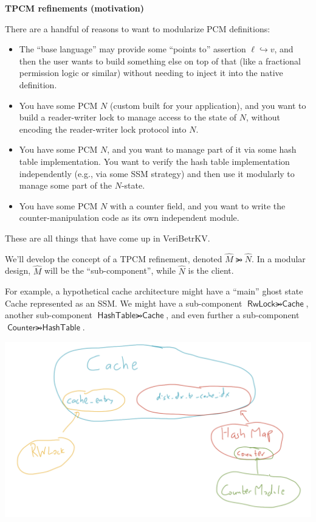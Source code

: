 \documentclass{article}
\newcommand{\pointsto}{\hookrightarrow}
\newcommand{\refines}{\rightarrowgtr}
\begin{document}
\textbf{TPCM refinements (motivation)}

There are a handful of reasons to want to modularize PCM definitions:
\begin{itemize}
  \item The ``base language'' may provide some ``points to'' assertion $\ell \pointsto v$,
    and then the user wants to build something else on top of that (like a fractional permission logic or similar) without needing to inject it into the native definition.
  \item You have some PCM $N$ (custom built for your application), and you want to build a reader-writer lock to manage
    access to the state of $N$, without encoding the reader-writer lock protocol into $N$.
  \item You have some PCM $N$, and you want to manage part of it via some hash table implementation. You want to verify the hash table implementation independently (e.g., via some SSM strategy) and then use it modularly to manage some part of the $N$-state.
  \item You have some PCM $N$ with a counter field, and you want to write the counter-manipulation code as its own independent module.
\end{itemize}
These are all things that have come up in VeriBetrKV.

We'll develop the concept of a TPCM refinement, denoted $\widehat{M} \refines \widehat{N}$.
In a modular design, $\widehat{M}$ will be the ``sub-component'', while $\widehat{N}$
is the client.

For example, a hypothetical cache architecture might have a ``main'' ghost state \textsf{Cache}
represented as an SSM.
We might have a sub-component $\textsf{RwLock} \refines \textsf{Cache}$,
another sub-component $\textsf{HashTable} \refines \textsf{Cache}$,
and even further a sub-component $\textsf{Counter} \refines \textsf{HashTable}$.

\begin{center}
\includegraphics[scale=0.3]{hypothetical-cache-architecture.png}
\end{center}
\end{document}
